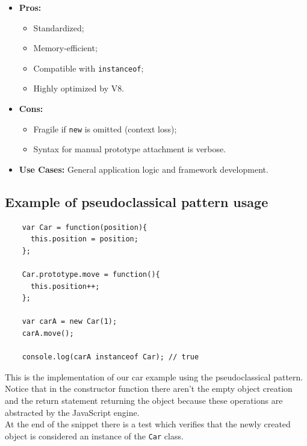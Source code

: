 \documentclass{scrbook}
\begin{document}
\begin{itemize}
    \item
        \textbf{Pros:}    
        \begin{itemize}
            \item Standardized;
            \item Memory-efficient;
            \item Compatible with \texttt{instanceof};
            \item Highly optimized by V8.
        \end{itemize}
    
    \item
        \textbf{Cons:}
        \begin{itemize}
            \item Fragile if \texttt{new} is omitted (context loss);
            \item Syntax for manual prototype attachment is verbose.
        \end{itemize}
    
    \item
        \textbf{Use Cases:} General application logic and framework development.
\end{itemize}

\subsection{Example of pseudoclassical pattern usage}

\begin{lstlisting}
    var Car = function(position){
      this.position = position;
    };
    
    Car.prototype.move = function(){
      this.position++;
    };
    
    var carA = new Car(1);
    carA.move();
    
    console.log(carA instanceof Car); // true
\end{lstlisting}

This is the implementation of our car example using the pseudoclassical pattern. Notice that in the constructor function there aren't the empty object creation and the return statement returning the object because these operations are abstracted by the JavaScript engine.\\

At the end of the snippet there is a test which verifies that the newly created object is considered an instance of the \texttt{Car} class.
\end{document}

